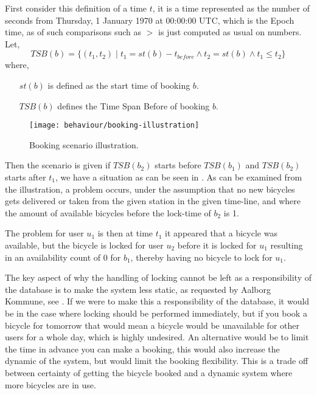First consider this definition of a time $t$, it is a time represented as the number of seconds from Thursday, 1 January 1970 at 00:00:00 UTC, which is the Epoch time, as of such comparisons such as $>$ is just computed as usual on numbers.
Let, 
$$TSB(b) = \{(t_1,t_2) \;| \;t_1 = st(b) - t_{before} \land t_2 = st(b) \land t_1 \leq t_2 \}$$
where,
\begin{itemize}[align = left]
	\item[$st(b)$] is defined as the start time of booking $b$.
	\item[$TSB(b)$] defines the Time Span Before of booking $b$.
\end{itemize} 

\begin{figure}[h]
	\centering
	\texttt{[image: behaviour/booking-illustration]}
	\caption{Booking scenario illustration.}\label{fig:booking-illustartion}
\end{figure}
Then the scenario is given if $TSB(b_2)$ starts before $TSB(b_1)$ and $TSB(b_2)$ starts after $t_1$, we have a situation as can be seen in .
As can be examined from the illustration, a problem occurs, under the assumption that no new bicycles gets delivered or taken from the given station in the given time-line, and where the amount of available bicycles before the lock-time of $b_2$ is 1.

The problem for user $u_1$ is then at time $t_1$ it appeared that a bicycle was available, but the bicycle is locked for user $u_2$ before it is locked for $u_1$ resulting in an availability count of 0 for $b_1$, thereby having no bicycle to lock for $u_1$.

The key aspect of why the handling of locking cannot be left as a responsibility of the database is to make the system less static, as requested by Aalborg Kommune, see .
If we were to make this a responsibility of the database, it would be in the case where locking should be performed immediately, but if you book a bicycle for tomorrow that would mean a bicycle would be unavailable for other users for a whole day, which is highly undesired.
An alternative would be to limit the time in advance you can make a booking, this would also increase the dynamic of the system, but would limit the booking flexibility.
This is a trade off between certainty of getting the bicycle booked and a dynamic system where more bicycles are in use.